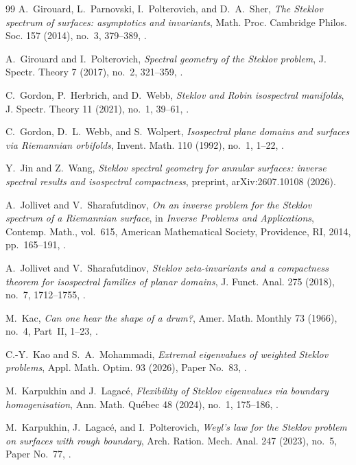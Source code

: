 \documentclass[11pt,letterpaper,reqno]{amsart}
\theoremstyle{definition}
\begin{document}
\begin{thebibliography}{99}
A.~Girouard, L.~Parnovski, I.~Polterovich, and D.~A.~Sher,
\emph{The Steklov spectrum of surfaces: asymptotics and invariants},
Math. Proc. Cambridge Philos. Soc. 157 (2014), no.~3, 379--389,
.

A.~Girouard and I.~Polterovich,
\emph{Spectral geometry of the Steklov problem},
J. Spectr. Theory 7 (2017), no.~2, 321--359,
.

C.~Gordon, P.~Herbrich, and D.~Webb,
\emph{Steklov and Robin isospectral manifolds},
J. Spectr. Theory 11 (2021), no.~1, 39--61,
.

C.~Gordon, D.~L.~Webb, and S.~Wolpert,
\emph{Isospectral plane domains and surfaces via Riemannian
orbifolds},
Invent. Math. 110 (1992), no.~1, 1--22,
.

Y.~Jin and Z.~Wang,
\emph{Steklov spectral geometry for annular surfaces:
inverse spectral results and isospectral compactness},
preprint, arXiv:2607.10108 (2026).

A.~Jollivet and V.~Sharafutdinov,
\emph{On an inverse problem for the Steklov spectrum of a Riemannian
surface},
in \emph{Inverse Problems and Applications}, Contemp. Math.,
vol.~615, American Mathematical Society, Providence, RI, 2014,
pp.~165--191,
.

A.~Jollivet and V.~Sharafutdinov,
\emph{Steklov zeta-invariants and a compactness theorem for
isospectral families of planar domains},
J. Funct. Anal. 275 (2018), no.~7, 1712--1755,
.

M.~Kac,
\emph{Can one hear the shape of a drum?},
Amer. Math. Monthly 73 (1966), no.~4, Part~II, 1--23,
.

C.-Y.~Kao and S.~A.~Mohammadi,
\emph{Extremal eigenvalues of weighted Steklov problems},
Appl. Math. Optim. 93 (2026), Paper No.~83,
.

M.~Karpukhin and J.~Lagac\'e,
\emph{Flexibility of Steklov eigenvalues via boundary homogenisation},
Ann. Math. Qu\'ebec 48 (2024), no.~1, 175--186,
.

M.~Karpukhin, J.~Lagac\'e, and I.~Polterovich,
\emph{Weyl's law for the Steklov problem on surfaces with rough
boundary},
Arch. Ration. Mech. Anal. 247 (2023), no.~5, Paper No.~77,
.


\end{thebibliography}
\end{document}
